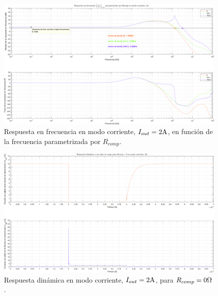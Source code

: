 \clearpage

\begin{figure}[H] %
\begin{center}
\includegraphics[width=1.1 \textwidth, angle=90]{./img/plots/rf/power_supply_RCOMP_RF_Modo3.png}
\caption{\label{fig:fig_power_supply_RCOMP_RF_Modo3}\footnotesize{Respuesta en frecuencia en modo corriente, $I_{out} = 2 \si[per-mode=symbol]{\ampere}$, en función de la frecuencia parametrizada por $R_{comp}$.}}
\end{center}
\end{figure}

\clearpage

\begin{figure}[H] %
\begin{center}
\includegraphics[width=1.1 \textwidth, angle=90]{./img/plots/dynamic/power_supply_RCOMP_0_STEP_Modo3.png}
\caption{\label{fig:fig_power_supply_RCOMP_STEP_0_Modo3}\footnotesize{Respuesta dinámica en modo corriente, $I_{out} = 2 \si[per-mode=symbol]{\ampere}$, para $R_{comp} = 0 \si[per-mode=symbol]{\ohm} $.}}
\end{center}
\end{figure}

